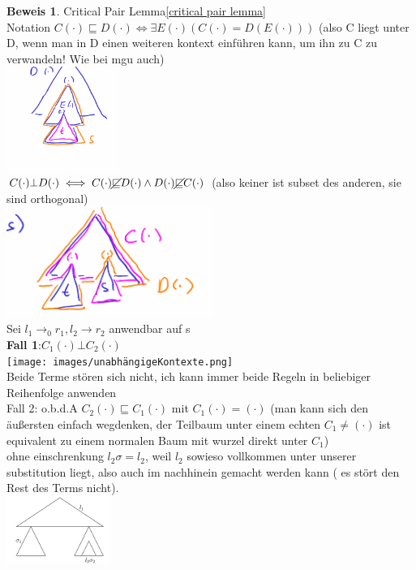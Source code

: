 \documentclass{article}
\theoremstyle{definition}
\newtheorem{beweis}{Beweis}[section]
\begin{document}
	\begin{beweis} Critical Pair Lemma\ref{critical pair lemma}\\
	Notation $C(\cdot) \sqsubseteq D(\cdot)\iff \exists E(\cdot)(C(\cdot)=D(E(\cdot)))$ (also C liegt unter D, wenn man in D einen weiteren kontext einführen kann, um ihn zu C zu verwandeln! Wie bei mgu auch)\\
	\includegraphics[height=128px]{images/CunterD.png}\\
	$C(\cdot)\bot D(\cdot)\iff C(\cdot)\cancel{\sqsubseteq} D(\cdot)\land D(\cdot)\cancel{\sqsubseteq} C(\cdot)$ (also keiner ist subset des anderen, sie sind orthogonal)\\
	\includegraphics[width=256px]{images/orthogonalKontext.png}\\
	Sei $l_1\to_0 r_1, l_2\to r_2$ anwendbar auf s\\
	\textbf{Fall 1}:$C_1(\cdot)\bot C_2(\cdot)$\\
	\texttt{[image: images/unabhängigeKontexte.png]}\\
	Beide Terme stören sich nicht, ich kann immer beide Regeln in beliebiger Reihenfolge anwenden\\
	Fall 2: o.b.d.A $C_2(\cdot)\sqsubseteq C_1(\cdot)$ mit $C_1(\cdot) =(\cdot)$ (man kann sich den äußersten einfach wegdenken, der Teilbaum unter einem echten $C_1\neq (\cdot)$ ist equivalent zu einem normalen Baum mit wurzel direkt unter $C_1$)\\
	ohne einschrenkung $l_2\sigma = l_2$, weil $l_2$ sowieso vollkommen unter unserer substitution liegt, also auch im nachhinein gemacht werden kann ( es stört den Rest des Terms nicht).\\
	\includegraphics[width=128px]{images/TeilbaumFall.png}\\

\end{beweis}
\end{document}
